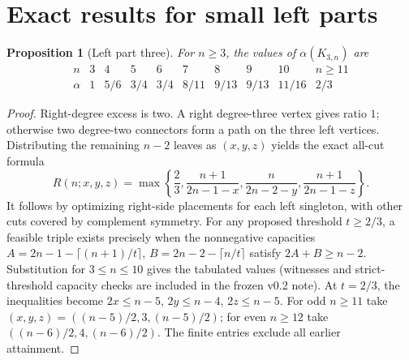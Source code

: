 \documentclass[11pt,a4paper]{article}
\newtheorem{proposition}[theorem]{Proposition}
\newcommand{\al}{\alpha}
\newcommand{\KK}[2]{K_{#1,#2}}
\begin{document}
\section{Exact results for small left parts}
\begin{proposition}[Left part three]\label{prop:k3}
For $n\ge3$, the values of $\al(\KK{3}{n})$ are
\[
\begin{array}{c|cccccccc|c}
n&3&4&5&6&7&8&9&10&n\ge11\\\hline
\al&1&5/6&3/4&3/4&8/11&9/13&9/13&11/16&2/3
\end{array}
\]
\end{proposition}
\begin{proof}
Right-degree excess is two. A right degree-three vertex gives ratio $1$; otherwise two degree-two connectors form a path on the three left vertices. Distributing the remaining $n-2$ leaves as $(x,y,z)$ yields the exact all-cut formula
\[
R(n;x,y,z)=\max\left\{\frac23,\frac{n+1}{2n-1-x},\frac{n}{2n-2-y},\frac{n+1}{2n-1-z}\right\}.
\]
It follows by optimizing right-side placements for each left singleton, with other cuts covered by complement symmetry. For any proposed threshold $t\ge2/3$, a feasible triple exists precisely when the nonnegative capacities $A=2n-1-\lceil(n+1)/t\rceil$, $B=2n-2-\lceil n/t\rceil$ satisfy $2A+B\ge n-2$. Substitution for $3\le n\le10$ gives the tabulated values (witnesses and strict-threshold capacity checks are included in the frozen v0.2 note). At $t=2/3$, the inequalities become $2x\le n-5$, $2y\le n-4$, $2z\le n-5$. For odd $n\ge11$ take $(x,y,z)=((n-5)/2,3,(n-5)/2)$; for even $n\ge12$ take $((n-6)/2,4,(n-6)/2)$. The finite entries exclude all earlier attainment.\end{proof}
\end{document}
